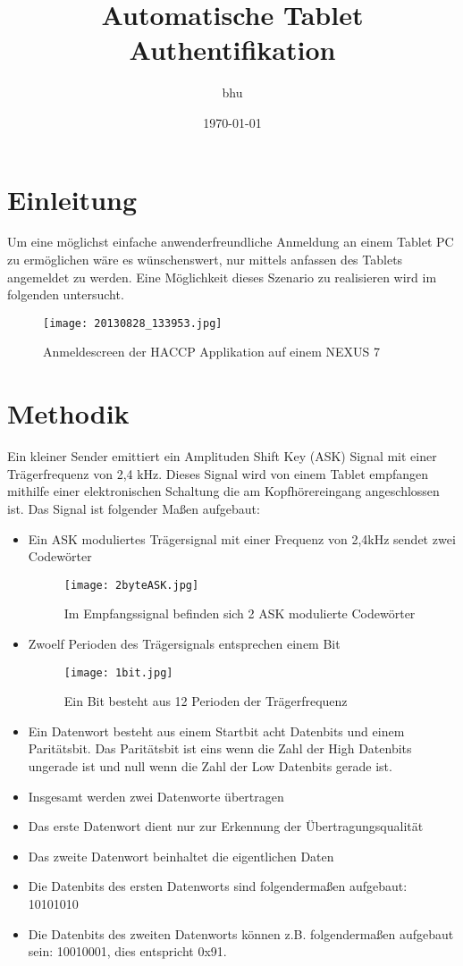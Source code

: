 \documentclass[10pt]{scrartcl}
\begin{document}
\title{Automatische Tablet Authentifikation}
\author{bhu}
\date{\today}
\maketitle

\tableofcontents
\part{Einleitung}
Um eine möglichst einfache anwenderfreundliche Anmeldung an einem Tablet PC zu ermöglichen wäre es wünschenswert, nur mittels anfassen des Tablets angemeldet zu werden. 
Eine Möglichkeit dieses Szenario zu realisieren wird im folgenden untersucht.
\begin{figure}[h!]
	\centering
	\texttt{[image: 20130828\_133953.jpg]}
	\caption{Anmeldescreen der HACCP Applikation auf einem NEXUS 7}
	\label{img:1bit}
\end{figure}
\part{Methodik}
Ein kleiner Sender emittiert ein Amplituden Shift Key (ASK) Signal mit einer Trägerfrequenz von 2,4 kHz. Dieses Signal wird von einem Tablet empfangen mithilfe einer elektronischen Schaltung die am Kopfhörereingang angeschlossen ist. Das Signal ist folgender Maßen aufgebaut:
\begin{itemize}
\item Ein ASK moduliertes Trägersignal mit einer Frequenz von 2,4kHz sendet zwei Codewörter
\begin{figure}[h!]
	\centering
	\texttt{[image: 2byteASK.jpg]}
	\caption{Im Empfangssignal befinden sich 2 ASK modulierte Codewörter}
	\label{img:1bit}
\end{figure}
\item Zwoelf Perioden des Trägersignals entsprechen einem Bit
\begin{figure}[h!]
	\centering
	\texttt{[image: 1bit.jpg]}
	\caption{Ein Bit besteht aus 12 Perioden der Trägerfrequenz}
	\label{img:1bit}
\end{figure}

\item Ein Datenwort besteht aus einem Startbit acht Datenbits und einem Paritätsbit. Das Paritätsbit ist eins wenn die Zahl der High Datenbits ungerade ist und null wenn die Zahl der Low Datenbits gerade ist.
\item Insgesamt werden zwei Datenworte übertragen
\item Das erste Datenwort dient nur zur Erkennung der Übertragungsqualität
\item Das zweite Datenwort beinhaltet die eigentlichen Daten
\item Die Datenbits des ersten Datenworts sind folgendermaßen aufgebaut: 10101010
\item Die Datenbits des zweiten Datenworts können z.B. folgendermaßen aufgebaut sein: 10010001, dies entspricht 0x91.
\end{itemize}
\end{document}
